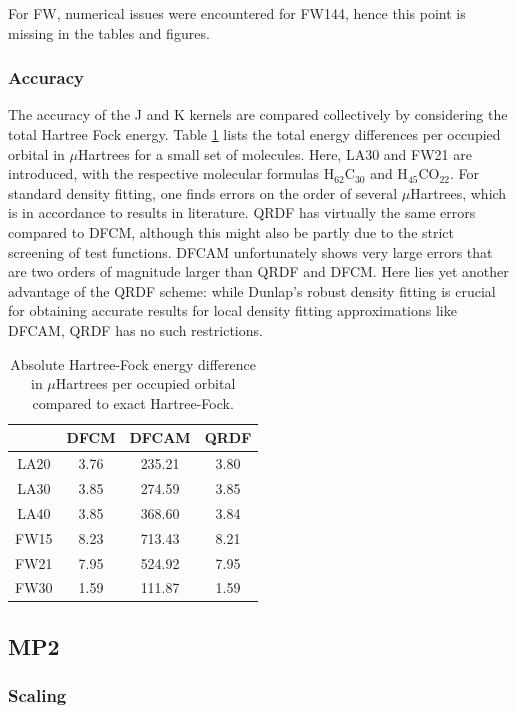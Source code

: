 For FW, numerical issues were encountered for FW144, hence this point is missing in the tables and figures.

\subsubsection{Accuracy}

The accuracy of the J and K kernels are compared collectively by considering the total Hartree Fock energy. Table \ref{tab:GSHFACCURACY} lists the total energy differences per occupied orbital in $\mu$Hartrees for a small set of molecules. Here, LA30 and FW21 are introduced, with the respective molecular formulas H$_{62}$C$_{30}$ and H$_{45}$CO$_{22}$. For standard density fitting, one finds errors on the order of several $\mu$Hartrees, which is in accordance to results in literature. QRDF has virtually the same errors compared to DFCM, although this might also be partly due to the strict screening of test functions. DFCAM unfortunately shows very large errors that are two orders of magnitude larger than QRDF and DFCM. Here lies yet another advantage of the QRDF scheme: while Dunlap's robust density fitting is crucial for obtaining accurate results for local density fitting approximations like DFCAM, QRDF has no such restrictions. 

\begin{table}[h!]
\centering
\begin{tabular}{cccc}
 \hline
 & DFCM & DFCAM & QRDF \\ \hline 
LA20 & 3.76 & 235.21 & 3.80 \\ 
LA30  & 3.85 & 274.59 & 3.85 \\ 
LA40 & 3.85 & 368.60 & 3.84 \\ 
FW15 & 8.23 & 713.43 & 8.21 \\ 
FW21 & 7.95 & 524.92 & 7.95 \\ 
FW30 & 1.59 & 111.87 & 1.59 \\ 
\hline 
\end{tabular}
\caption{Absolute Hartree-Fock energy difference in $\mu$Hartrees per occupied orbital compared to exact Hartree-Fock.}
\label{tab:GSHFACCURACY}
\end{table}

\FloatBarrier

\subsection{MP2}

\subsubsection{Scaling}

